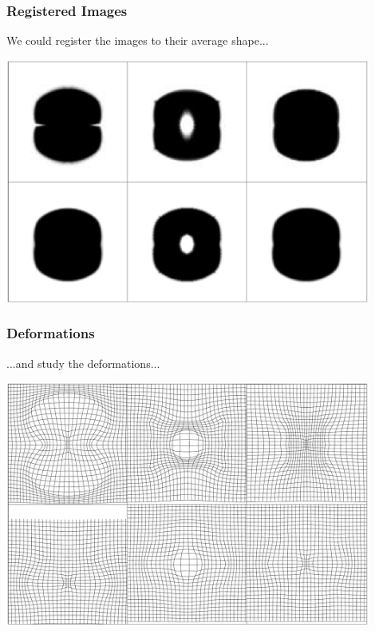 \documentclass{beamer}
\begin{document}


\begin{frame}
\frametitle{Registered Images}
We could register the images to their average shape...
\begin{center}
\includegraphics[width=0.9\textwidth]{warped}
\end{center}
\end{frame}

\begin{frame}
\frametitle{Deformations}
...and study the deformations...
\begin{center}
\includegraphics[width=0.9\textwidth]{deformations}
\end{center}
\end{frame}
\end{document}
